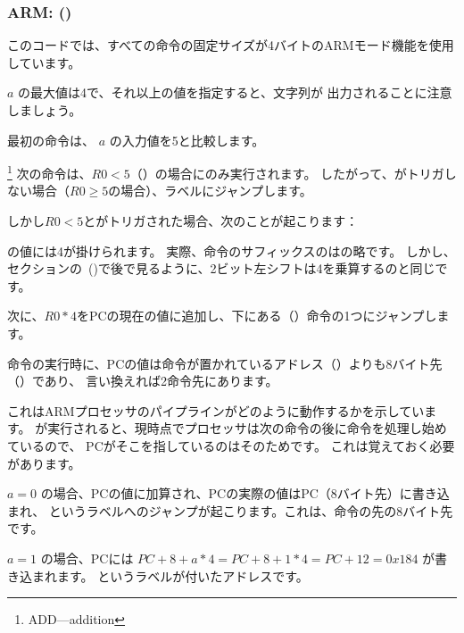 ﻿\subsubsection{ARM: \OptimizingKeilVI (\ARMMode)}
\label{sec:SwitchARMLot}



このコードでは、すべての命令の固定サイズが4バイトのARMモード機能を使用しています。

$a$ の最大値は4で、それ以上の値を指定すると、文字列が
出力されることに注意しましょう。

最初の命令は、 $a$ の入力値を5と比較します。

\footnote{ADD---addition}
次の命令は、$R0 < 5$（）の場合にのみ実行されます。
したがって、がトリガしない場合（$R0 \geq 5$の場合）、ラベルにジャンプします。

しかし$R0 < 5$とがトリガされた場合、次のことが起こります：

の値には4が掛けられます。
実際、命令のサフィックスのはの略です。
しかし、セクション\q{\ShiftsSectionName}の~()で後で見るように、2ビット左シフトは4を乗算するのと同じです。

次に、$R0*4$を\ac{PC}の現在の値に追加し、下にある（）命令の1つにジャンプします。

命令の実行時に、\ac{PC}の値は命令が置かれているアドレス（）よりも8バイト先（）であり、
言い換えれば2命令先にあります。


これはARMプロセッサのパイプラインがどのように動作するかを示しています。
が実行されると、現時点でプロセッサは次の命令の後に命令を処理し始めているので、
\ac{PC}がそこを指しているのはそのためです。 
これは覚えておく必要があります。

$a=0$ の場合、\ac{PC}の値に加算され、\ac{PC}の実際の値は\ac{PC}（8バイト先）に書き込まれ、
というラベルへのジャンプが起こります。これは、命令の先の8バイト先です。

$a=1$ の場合、\ac{PC}には $PC+8+a*4 = PC+8+1*4 = PC+12 = 0x184$ が書き込まれます。
というラベルが付いたアドレスです。

